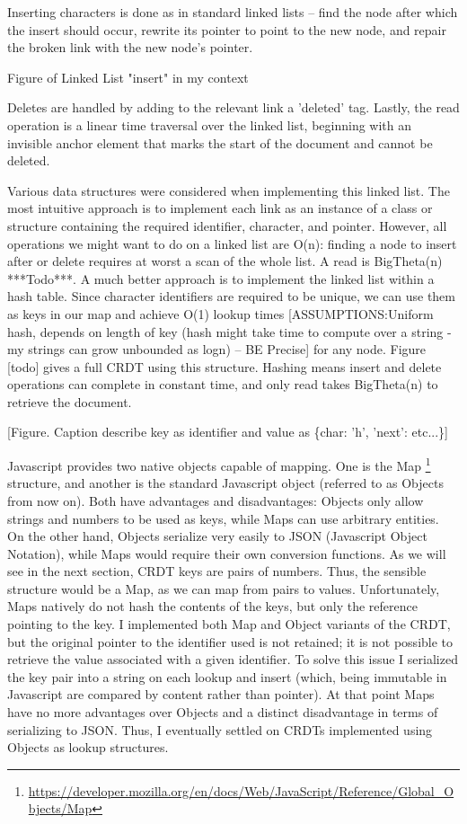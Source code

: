 \documentclass[12pt,a4paper,twoside,openright]{report}
\begin{document}
		Inserting characters is done as in standard linked lists -- find the node after which the insert should occur, rewrite its pointer to point to the new node, and repair the broken link with the new node's pointer.
		
		Figure of Linked List "insert" in my context
		
		Deletes are handled by adding to the relevant link a 'deleted' tag. Lastly, the read operation is a linear time traversal over the linked list, beginning with an invisible anchor element that marks the start of the document and cannot be deleted.
		
		Various data structures were considered when implementing this linked list. The most intuitive approach is to implement each link as an instance of a class or structure containing the required identifier, character, and pointer. However, all operations we might want to do on a linked list are O(n): finding a node to insert after or delete requires at worst a scan of the whole list. A read is BigTheta(n) ***Todo***. A much better approach is to implement the linked list within a hash table. Since character identifiers are required to be unique, we can use them as keys in our map and achieve O(1) lookup times [ASSUMPTIONS:Uniform hash, depends on length of key (hash might take time to compute over a string - my strings can grow unbounded as logn) -- BE Precise] for any node. Figure [todo] gives a full CRDT using this structure. Hashing means insert and delete operations can complete in constant time, and only read takes BigTheta(n) to retrieve the document.
		
		[Figure. Caption describe key as identifier and value as \{char: 'h', 'next': etc...\}]
		
		Javascript provides two native objects capable of mapping. One is the Map \footnote{\url{https://developer.mozilla.org/en/docs/Web/JavaScript/Reference/Global_Objects/Map}} structure, and another is the standard Javascript object (referred to as Objects from now on). Both have advantages and disadvantages: Objects only allow strings and numbers to be used as keys, while Maps can use arbitrary entities. On the other hand, Objects serialize very easily to JSON (Javascript Object Notation), while Maps would require their own conversion functions. As we will see in the next section, CRDT keys are pairs of numbers. Thus, the sensible structure would be a Map, as we can map from pairs to values. Unfortunately, Maps natively do not hash the contents of the keys, but only the reference pointing to the key. I implemented both Map and Object variants of the CRDT, but the original pointer to the identifier used is not retained; it is not possible to retrieve the value associated with a given identifier. To solve this issue I serialized the key pair into a string on each lookup and insert (which, being immutable in Javascript are compared by content rather than pointer). At that point Maps have no more advantages over Objects and a distinct disadvantage in terms of serializing to JSON. Thus, I eventually settled on CRDTs implemented using Objects as lookup structures.
		
\end{document}
